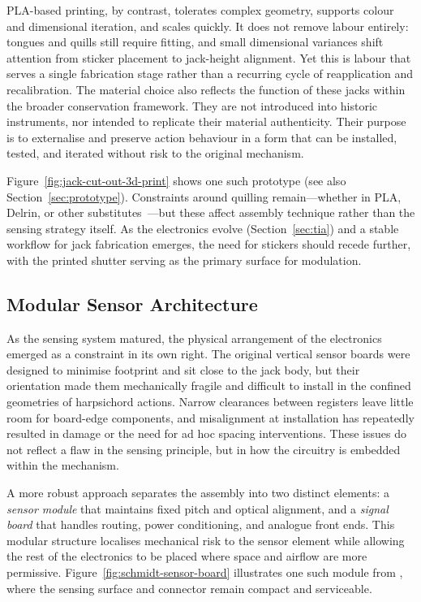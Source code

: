 PLA-based printing, by contrast, tolerates complex geometry, supports colour and dimensional iteration, and scales quickly. It does not remove labour entirely: tongues and quills still require fitting, and small dimensional variances shift attention from sticker placement to jack-height alignment. Yet this is labour that serves a single fabrication stage rather than a recurring cycle of reapplication and recalibration. The material choice also reflects the function of these jacks within the broader conservation framework. They are not introduced into historic instruments, nor intended to replicate their material authenticity. Their purpose is to externalise and preserve action behaviour in a form that can be installed, tested, and iterated without risk to the original mechanism.

Figure~\ref{fig:jack-cut-out-3d-print} shows one such prototype (see also Section~\ref{sec:prototype}). Constraints around quilling remain—whether in PLA, Delrin, or other substitutes~\cite{bcn3d_pla_2019,dupont_delrin_2017,barclay_preservation_2005}—but these affect assembly technique rather than the sensing strategy itself. As the electronics evolve (Section~\ref{sec:tia}) and a stable workflow for jack fabrication emerges, the need for stickers should recede further, with the printed shutter serving as the primary surface for modulation.


\subsection{Modular Sensor Architecture}\label{sec:future-pcb-layout}

As the sensing system matured, the physical arrangement of the electronics emerged as a constraint in its own right. The original vertical sensor boards were designed to minimise footprint and sit close to the jack body, but their orientation made them mechanically fragile and difficult to install in the confined geometries of harpsichord actions. Narrow clearances between registers leave little room for board-edge components, and misalignment at installation has repeatedly resulted in damage or the need for ad hoc spacing interventions. These issues do not reflect a flaw in the sensing principle, but in how the circuitry is embedded within the mechanism.

A more robust approach separates the assembly into two distinct elements: a \emph{sensor module} that maintains fixed pitch and optical alignment, and a \emph{signal board} that handles routing, power conditioning, and analogue front ends. This modular structure localises mechanical risk to the sensor element while allowing the rest of the electronics to be placed where space and airflow are more permissive. Figure~\ref{fig:schmidt-sensor-board} illustrates one such module from \textcite{schmidt_sparksichord_2025}, where the sensing surface and connector remain compact and serviceable.

